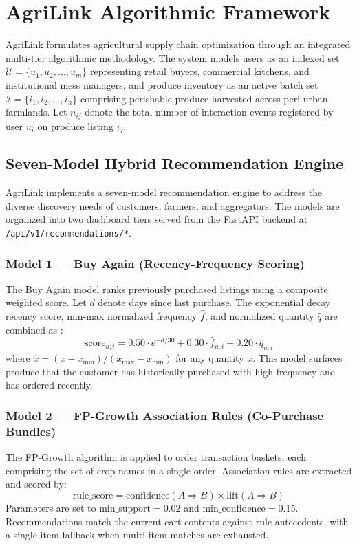 \section{AgriLink Algorithmic Framework}
\label{sec:Methodology}
AgriLink formulates agricultural supply chain optimization through an integrated multi-tier algorithmic methodology. The system models users as an indexed set $\mathcal{U} = \{u_1, u_2, \dots, u_m\}$ representing retail buyers, commercial kitchens, and institutional mess managers, and produce inventory as an active batch set $\mathcal{I} = \{i_1, i_2, \dots, i_n\}$ comprising perishable produce harvested across peri-urban farmlands. Let $n_{ij}$ denote the total number of interaction events registered by user $u_i$ on produce listing $i_j$.

\subsection{Seven-Model Hybrid Recommendation Engine}
\label{subsec:rec_engine}
AgriLink implements a seven-model recommendation engine to address the diverse discovery needs of customers, farmers, and aggregators. The models are organized into two dashboard tiers served from the FastAPI backend at \texttt{/api/v1/recommendations/*}.

\subsubsection{Model 1 --- Buy Again (Recency-Frequency Scoring)}
The Buy Again model ranks previously purchased listings using a composite weighted score. Let $d$ denote days since last purchase. The exponential decay recency score, min-max normalized frequency $\hat{f}$, and normalized quantity $\hat{q}$ are combined as \cite{Hu2008, Koren2010}:
\begin{equation}
\text{score}_{u,i} = 0.50 \cdot e^{-d/30} + 0.30 \cdot \hat{f}_{u,i} + 0.20 \cdot \hat{q}_{u,i}
\label{eqn:buy_again}
\end{equation}
where $\hat{x} = (x - x_{\min})/(x_{\max} - x_{\min})$ for any quantity $x$. This model surfaces produce that the customer has historically purchased with high frequency and has ordered recently.

\subsubsection{Model 2 --- FP-Growth Association Rules (Co-Purchase Bundles)}
The FP-Growth algorithm \cite{Han2000} is applied to order transaction baskets, each comprising the set of crop names in a single order. Association rules are extracted and scored by:
\begin{equation}
\text{rule\_score} = \text{confidence}(A \Rightarrow B) \times \text{lift}(A \Rightarrow B)
\label{eqn:fp_score}
\end{equation}
Parameters are set to $\text{min\_support} = 0.02$ and $\text{min\_confidence} = 0.15$. Recommendations match the current cart contents against rule antecedents, with a single-item fallback when multi-item matches are exhausted.

